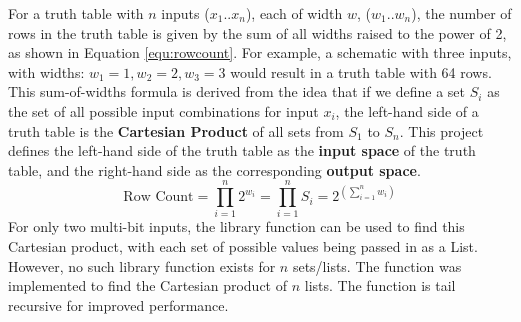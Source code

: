 For a truth table with $n$ inputs ($x_1 .. x_n$), each of width $w$, ($w_1 .. w_n$), the number of rows in the truth table is given by the sum of all widths raised to the power of 2, as shown in Equation \ref{equ:rowcount}. For example, a schematic with three inputs, with widths: $w_1 = 1, w_2 = 2, w_3 = 3$ would result in a truth table with 64 rows. This sum-of-widths formula is derived from the idea that if we define a set $S_i$ as the set of all possible input combinations for input $x_i$, the left-hand side of a truth table is the \textbf{Cartesian Product} of all sets from $S_1$ to $S_n$. This project defines the left-hand side of the truth table as the \textbf{input space} of the truth table, and the right-hand side as the corresponding \textbf{output space}.
\begin{equation} \label{equ:rowcount}
    \textrm{Row Count} = \prod_{i=1}^{n} 2^{w_i} = \prod_{i=1}^{n} S_i = 2^ {\left( \sum_{i=1}^{n} w_i \right)}
\end{equation}
For only two multi-bit inputs, the library function  \cite{ListFuns} can be used to find this Cartesian product, with each set of possible values being passed in as a List. However, no such library function exists for $n$ sets/lists. The function  was implemented to find the Cartesian product of $n$ lists. The function is tail recursive for improved performance.


